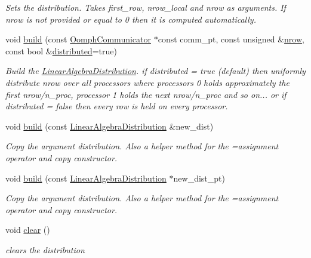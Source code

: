 \begin{DoxyCompactItemize}
\begin{DoxyCompactList}\small\item\em Sets the distribution. Takes first\+\_\+row, nrow\+\_\+local and nrow as arguments. If nrow is not provided or equal to 0 then it is computed automatically. \end{DoxyCompactList}\item 
void \hyperlink{classoomph_1_1LinearAlgebraDistribution_a0cc6e977d9922918c86b4546a5cf1e1a}{build} (const \hyperlink{classoomph_1_1OomphCommunicator}{Oomph\+Communicator} $\ast$const comm\+\_\+pt, const unsigned \&\hyperlink{classoomph_1_1LinearAlgebraDistribution_aafad0b69de2284808366b65bd63e493b}{nrow}, const bool \&\hyperlink{classoomph_1_1LinearAlgebraDistribution_a05842d032d28880ae37951deae804ad8}{distributed}=true)
\begin{DoxyCompactList}\small\item\em Build the \hyperlink{classoomph_1_1LinearAlgebraDistribution}{Linear\+Algebra\+Distribution}. if distributed = true (default) then uniformly distribute nrow over all processors where processors 0 holds approximately the first nrow/n\+\_\+proc, processor 1 holds the next nrow/n\+\_\+proc and so on... or if distributed = false then every row is held on every processor. \end{DoxyCompactList}\item 
void \hyperlink{classoomph_1_1LinearAlgebraDistribution_a49b331da406e8a5b5af87f4177ddd41e}{build} (const \hyperlink{classoomph_1_1LinearAlgebraDistribution}{Linear\+Algebra\+Distribution} \&new\+\_\+dist)
\begin{DoxyCompactList}\small\item\em Copy the argument distribution. Also a helper method for the =assignment operator and copy constructor. \end{DoxyCompactList}\item 
void \hyperlink{classoomph_1_1LinearAlgebraDistribution_ae1ac321822ddea9a156dc46a1d3bad86}{build} (const \hyperlink{classoomph_1_1LinearAlgebraDistribution}{Linear\+Algebra\+Distribution} $\ast$new\+\_\+dist\+\_\+pt)
\begin{DoxyCompactList}\small\item\em Copy the argument distribution. Also a helper method for the =assignment operator and copy constructor. \end{DoxyCompactList}\item 
void \hyperlink{classoomph_1_1LinearAlgebraDistribution_ac23e08b5c10d041a01bead478573a8ea}{clear} ()
\begin{DoxyCompactList}\small\item\em clears the distribution \end{DoxyCompactList}\item 

\end{DoxyCompactItemize}
